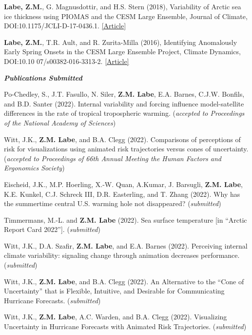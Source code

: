 \documentclass[margin,line,palatino,courier,10pt]{res}
\begin{document}
\begin{resume}
\begin{etaremune}[leftmargin=0in,topsep=0in,parsep=0in]
\item \textbf{Labe, Z.M.}, G. Magnusdottir, and H.S. Stern (2018), Variability of Arctic sea ice thickness using PIOMAS and the CESM Large Ensemble, Journal of Climate, DOI:10.1175/JCLI-D-17-0436.1. \href{https://journals.ametsoc.org/doi/abs/10.1175/JCLI-D-17-0436.1}{[Article]}
\item \textbf{Labe, Z.M.}, T.R. Ault, and R. Zurita-Milla (2016), Identifying Anomalously Early Spring Onsets in the CESM Large Ensemble Project, Climate Dynamics, DOI:10.10 07/s00382-016-3313-2. \href{http://link.springer.com/article/10.1007/s00382-016-3313-2}{[Article]}
\end{etaremune}

\textit{\textbf{Publications Submitted}}
\vspace*{-0.1in}\\
\begin{etaremune}[leftmargin=0in,topsep=0in,parsep=0in]
\item Po-Chedley, S., J.T. Fasullo, N. Siler, \textbf{Z.M. Labe}, E.A. Barnes, C.J.W. Bonfils, and B.D. Santer (2022). Internal variability and forcing influence model-satellite differences in the rate of tropical tropospheric warming. (\textit{accepted to Proceedings of the National Academy of Sciences})
\item Witt, J.K., \textbf{Z.M. Labe}, and B.A. Clegg (2022). Comparisons of perceptions of risk for visualizations using animated risk trajectories versus cones of uncertainty. (\textit{accepted to Proceedings of 66th Annual Meeting the Human Factors and Ergonomics Society})
\item Eischeid, J.K., M.P. Hoerling, X.-W. Quan, A.Kumar, J. Barsugli, \textbf{Z.M. Labe}, K.E. Kunkel, C.J. Schreck III, D.R. Easterling, and T. Zhang (2022). Why has the summertime central U.S. warming hole not disappeared? (\textit{submitted})
\item Timmermans, M.-L. and \textbf{Z.M. Labe} (2022). Sea surface temperature [in ``Arctic Report Card 2022'']. (\textit{submitted})
\item Witt, J.K., D.A. Szafir, \textbf{Z.M. Labe}, and E.A. Barnes (2022). Perceiving internal climate variability: signaling change through animation decreases performance. (\textit{submitted})
\item Witt, J.K., \textbf{Z.M. Labe}, and B.A. Clegg (2022). An Alternative to the ``Cone of Uncertainty'' that is Flexible, Intuitive, and Desirable for Communicating Hurricane Forecasts. (\textit{submitted})
\item Witt, J.K., \textbf{Z.M. Labe}, A.C. Warden, and B.A. Clegg (2022). Visualizing Uncertainty in Hurricane Forecasts with Animated Risk Trajectories. (\textit{submitted})
\end{etaremune}


\end{resume}
\end{document}
